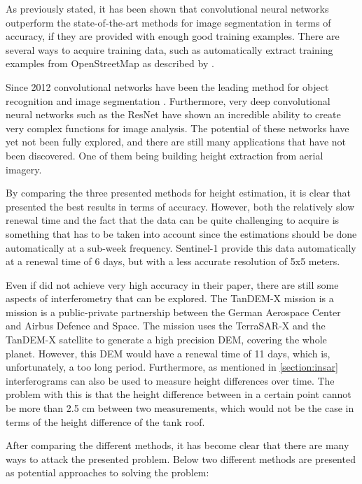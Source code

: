 As previously stated, it has been shown that convolutional neural networks outperform the state-of-the-art methods for image segmentation in terms of accuracy, if they are provided with enough good training examples. There are several ways to acquire training data, such as automatically extract training examples from OpenStreetMap as described by \cite{Kaiser2017}. 

Since 2012 convolutional networks have been the leading method for object recognition and image segmentation \citep{Krizhevsky2012}. Furthermore, very deep convolutional neural networks such as the ResNet \citep{Wu2017} have shown an incredible ability to create very complex functions for image analysis. The potential of these networks have yet not been fully explored, and there are still many applications that have not been discovered. One of them being building height extraction from aerial imagery.

By comparing the three presented methods for height estimation, it is clear that \cite{Brunner2008} presented the best results in terms of accuracy. However, both the relatively slow renewal time and the fact that the data can be quite challenging to acquire is something that has to be taken into account since the estimations should be done automatically at a sub-week frequency. Sentinel-1 provide this data automatically at a renewal time of 6 days, but with a less accurate resolution of 5x5 meters.

Even if \cite{Liu2015} did not achieve very high accuracy in their paper, there are still some aspects of interferometry that can be explored. The TanDEM-X mission is a mission is a public-private partnership between the German Aerospace Center and Airbus Defence and Space. The mission uses the TerraSAR-X and the TanDEM-X satellite to generate a high precision DEM, covering the whole planet. However, this DEM would have a renewal time of 11 days, which is, unfortunately, a too long period. Furthermore, as mentioned in \autoref{section:insar} interferograms can also be used to measure height differences over time. The problem with this is that the height difference between in a certain point cannot be more than 2.5 cm between two measurements, which would not be the case in terms of the height difference of the tank roof.

After comparing the different methods, it has become clear that there are many ways to attack the presented problem. Below two different methods are presented as potential approaches to solving the problem:

